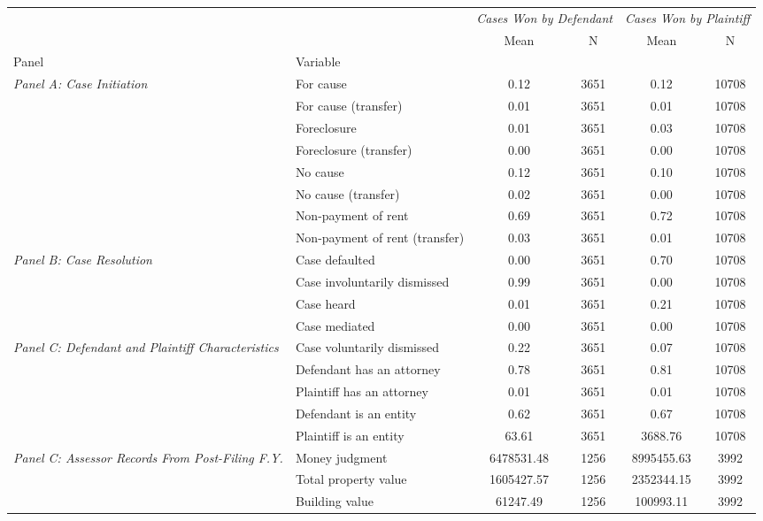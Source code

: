 \begin{tabular}{llcccc}
\toprule
 &  & \multicolumn{2}{c}{\textit{Cases Won by Defendant}} & \multicolumn{2}{c}{\textit{Cases Won by Plaintiff}} \\
 &  & Mean & N & Mean & N \\
Panel & Variable &  &  &  &  \\
\midrule
\multirow[c]{8}{4cm}{\textit{Panel A: Case Initiation}} & For cause & 0.12 & 3651 & 0.12 & 10708 \\
 & For cause (transfer) & 0.01 & 3651 & 0.01 & 10708 \\
 & Foreclosure & 0.01 & 3651 & 0.03 & 10708 \\
 & Foreclosure (transfer) & 0.00 & 3651 & 0.00 & 10708 \\
 & No cause & 0.12 & 3651 & 0.10 & 10708 \\
 & No cause (transfer) & 0.02 & 3651 & 0.00 & 10708 \\
 & Non-payment of rent & 0.69 & 3651 & 0.72 & 10708 \\
 & Non-payment of rent (transfer) & 0.03 & 3651 & 0.01 & 10708 \\
\cline{1-6}
\multirow[c]{4}{4cm}{\textit{Panel B: Case Resolution}} & Case defaulted & 0.00 & 3651 & 0.70 & 10708 \\
 & Case involuntarily dismissed & 0.99 & 3651 & 0.00 & 10708 \\
 & Case heard & 0.01 & 3651 & 0.21 & 10708 \\
 & Case mediated & 0.00 & 3651 & 0.00 & 10708 \\
\cline{1-6}
\multirow[c]{5}{4cm}{\textit{Panel C: Defendant and Plaintiff Characteristics}} & Case voluntarily dismissed & 0.22 & 3651 & 0.07 & 10708 \\
 & Defendant has an attorney & 0.78 & 3651 & 0.81 & 10708 \\
 & Plaintiff has an attorney & 0.01 & 3651 & 0.01 & 10708 \\
 & Defendant is an entity & 0.62 & 3651 & 0.67 & 10708 \\
 & Plaintiff is an entity & 63.61 & 3651 & 3688.76 & 10708 \\
\cline{1-6}
\multirow[c]{5}{4cm}{\textit{Panel C: Assessor Records From Post-Filing F.Y.}} & Money judgment & 6478531.48 & 1256 & 8995455.63 & 3992 \\
 & Total property value & 1605427.57 & 1256 & 2352344.15 & 3992 \\
 & Building value & 61247.49 & 1256 & 100993.11 & 3992 \\

\end{tabular}
